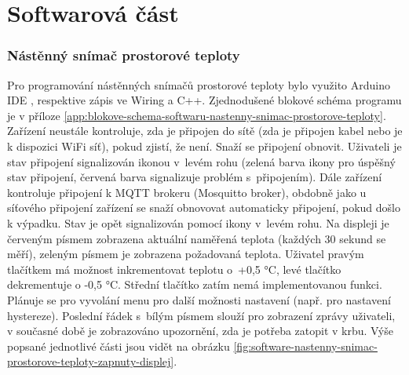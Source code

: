 \chapter{Softwarová část}

\subsection{Nástěnný snímač prostorové teploty}
Pro programování nástěnných snímačů prostorové teploty bylo využito Arduino IDE \cite{arduino-ide}, respektive zápis ve Wiring a C++. Zjednodušené blokové schéma programu je v příloze \ref{app:blokove-schema-softwaru-nastenny-snimac-prostorove-teploty}. Zařízení neustále kontroluje, zda je připojen do sítě (zda je připojen kabel nebo je k dispozici WiFi síť), pokud zjistí, že není. Snaží se připojení obnovit. Uživateli je stav připojení signalizován ikonou v~levém rohu (zelená barva ikony pro úspěšný stav připojení, červená barva signalizuje problém s~připojením). Dále zařízení kontroluje připojení k MQTT brokeru (Mosquitto broker), obdobně jako u síťového připojení zařízení se snaží obnovovat automaticky připojení, pokud došlo k výpadku. Stav je opět signalizován pomocí ikony v~levém rohu. Na displeji je červeným písmem zobrazena aktuální naměřená teplota (každých 30 sekund se měří), zeleným písmem je zobrazena požadovaná teplota. Uživatel pravým tlačítkem má možnost inkrementovat teplotu o~+0,5 °C, levé tlačítko dekrementuje o -0,5 °C. Střední tlačítko zatím nemá implementovanou funkci. Plánuje se pro vyvolání menu pro další možnosti nastavení (např. pro nastavení hystereze). Poslední řádek s~bílým písmem slouží pro zobrazení zprávy uživateli, v současné době je zobrazováno upozornění, zda je potřeba zatopit v krbu. Výše popsané jednotlivé části jsou vidět na obrázku \ref{fig:software-nastenny-snimac-prostorove-teploty-zapnuty-displej}. 

